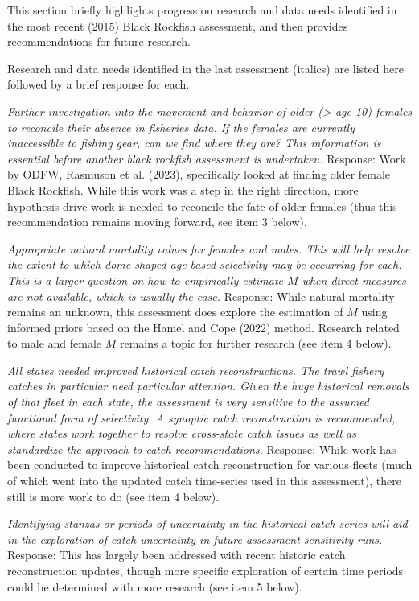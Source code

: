 \documentclass[11pt,
  letterpaper,
]{article}
\begin{document}
This section briefly highlights progress on research and data needs identified in the most recent (2015) Black Rockfish assessment, and then provides recommendations for future research.

Research and data needs identified in the last assessment (italics) are listed here followed by a brief response for each.

\textit{Further investigation into the movement and behavior of older (> age 10) females to reconcile their absence in fisheries data. If the females are currently inaccessible to fishing gear, can we find where they are? This information is essential before another black rockfish assessment is undertaken.} Response: Work by ODFW, Rasmuson et al. (2023), specifically looked at finding older female Black Rockfish. While this work was a step in the right direction, more hypothesis-drive work is needed to reconcile the fate of older females (thus this recommendation remains moving forward, see item 3 below).

\textit{Appropriate natural mortality values for females and males. This will help resolve the extent to which dome-shaped age-based selectivity may be occurring for each. This is a larger question on how to empirically estimate $M$ when direct measures are not available, which is usually the case.} Response: While natural mortality remains an unknown, this assessment does explore the estimation of \(M\) using informed priors based on the Hamel and Cope (2022) method. Research related to male and female \(M\) remains a topic for further research (see item 4 below).

\textit{All states needed improved historical catch reconstructions. The trawl fishery catches in particular need particular attention. Given the huge historical removals of that fleet in each state, the assessment is very sensitive to the assumed functional form of selectivity. A synoptic catch reconstruction is recommended, where states work together to resolve cross-state catch issues as well as standardize the approach to catch recommendations.} Response: While work has been conducted to improve historical catch reconstruction for various fleets (much of which went into the updated catch time-series used in this assessment), there still is more work to do (see item 4 below).

\textit{Identifying stanzas or periods of uncertainty in the historical catch series will aid in the exploration of catch uncertainty in future assessment sensitivity runs.} Response: This has largely been addressed with recent historic catch reconstruction updates, though more specific exploration of certain time periods could be determined with more research (see item 5 below).
\end{document}
